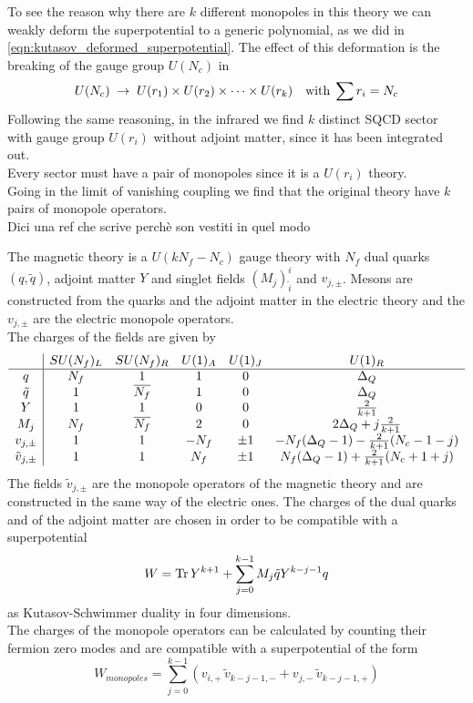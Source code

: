 To see the reason why there are $k$ different monopoles in this theory we can weakly deform the superpotential to a generic polynomial, as we did in \eqref{eqn:kutasov_deformed_superpotential}.
The effect of this deformation is the breaking of the gauge group $U(N_c)$ in 
\begin{equation}
U(N_c) \; \rightarrow \; U(r_1) \times U(r_2) \times \dots \times U(r_k) \quad \hbox{with} \; \sum r_i = N_c
\end{equation}
Following the same reasoning, in the infrared we find $k$ distinct SQCD sector with gauge group $U(r_i)$ without adjoint matter, since it has been integrated out.\\
Every sector must have a pair of monopoles since it is a $U(r_i)$ theory.\\
Going in the limit of vanishing coupling we find that the original theory have $k$ pairs of monopole operators.\\
{\Large Dici una ref che scrive perchè son vestiti in quel modo }

The magnetic theory is a $U(k N_f - N_c)$ gauge theory with $N_f$ dual quarks $(q,\tilde{q})$, adjoint matter $Y$ and singlet fields $(M_j)^{i}_{\tilde{i}}$ and $v_{j,\pm}$. Mesons are constructed from the quarks and the adjoint matter in the electric theory and the $v_{j,\pm}$ are the electric monopole operators.\\
The charges of the fields are given by
\begin{equation}
\begin{array}{ c | c c c c c }
  & SU(N_f)_L & SU(N_f)_R & U(1)_A & U(1)_J  & U(1)_R   \\
 \hline
 q & N_f & 1& 1 & 0   & \Delta_Q  \\  
 \tilde{q} & 1 & \overline{N_f} & 1 & 0 & \Delta_Q      \\  
  Y & 1 & 1  & 0 & 0 & \frac{2}{k+1}  \\ 
  M_j & N_f & \overline{N_f} & 2  &  0& 2 \Delta_Q + j \frac{2}{k+1} \\
  v_{j,\pm} & 1  &1   & - N_f & \pm 1 & -N_f (\Delta_Q-1 ) - \frac{2}{k+1} (N_c-1 - j) \\
 \tilde{v}_{j,\pm} & 1  &1   & N_f & \pm 1 & N_f (\Delta_Q-1 ) + \frac{2}{k+1} (N_c + 1 + j) \\
\end{array}
\end{equation}
The fields $\tilde{v}_{j,\pm}$ are the monopole operators of the magnetic theory and are constructed in the same way of the electric ones.
The charges of the dual quarks and of the adjoint matter are chosen in order to be compatible with a superpotential 
\begin{equation}
W = \mathrm{Tr } \,{ Y^{k+1}} + \sum_{j=0}^{k-1} M_j \tilde{q} Y^{k - j - 1} q 
\end{equation}
as Kutasov-Schwimmer duality in four dimensions.\\
The charges of the monopole operators can be calculated by counting their fermion zero modes and are compatible with a superpotential of the form
\begin{equation}
W_{monopoles} = \sum_{j=0}^{k-1} \left(   v_{i,+} \, \tilde{v}_{k-j-1,-} + v_{j,-} \, \tilde{v}_{k-j-1,+} \right)
\end{equation}
